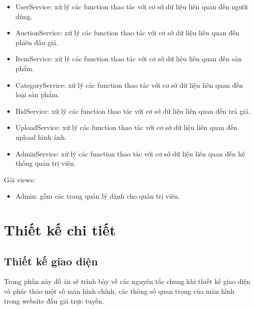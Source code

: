 \documentclass[../DoAn.tex]{subfiles}
\begin{document}
\begin{itemize}
    \item UserService: xử lý các function thao tác với cơ sở dữ liệu liên quan đến người dùng.
    \item AuctionService: xử lý các function thao tác với cơ sở dữ liệu liên quan đến phiên đấu giá.
    \item ItemService: xử lý các function thao tác với cơ sở dữ liệu liên quan đến sản phẩm.
    \item CategoryService: xử lý các function thao tác với cơ sở dữ liệu liên quan đến loại sản phẩm.
    \item BidService: xử lý các function thao tác với cơ sở dữ liệu liên quan đến trả giá.
    \item UploadService: xử lý các function thao tác với cơ sở dữ liệu liên quan đến upload hình ảnh.
    \item AdminService: xử lý các function thao tác với cơ sở dữ liệu liên quan đến hệ thống quản trị viên.
\end{itemize}
Gói views: 
\begin{itemize}
    \item Admin: gồm các trang quản lý dành cho quản trị viên.
\end{itemize}
\section{Thiết kế chi tiết}
\subsection{Thiết kế giao diện}
Trong phần này đồ án sẽ trình bày về các nguyên tắc chung khi thiết kế giao diện  và phác thảo một số màn hình chính, các thông số quan trọng của màn hình trong website đấu giá trực tuyến.
\end{document}
